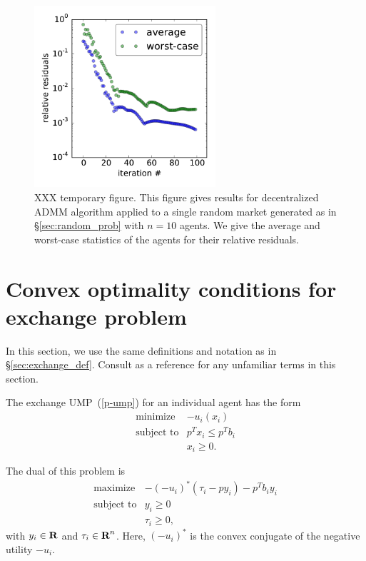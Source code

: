 \documentclass[12pt]{article}
\begin{document}
\begin{figure}
\begin{center}
\includegraphics[width=0.6\textwidth]{figures/admm}
\end{center}
\caption{XXX temporary figure. This figure gives results for decentralized ADMM
algorithm applied to a single random market generated as in
\S\ref{sec:random_prob} with $n=10$ agents. We give the average and worst-case
statistics of the agents for their relative residuals.}
\label{f-admm}
\end{figure}


\appendix


\section{Convex optimality conditions for exchange problem}
\label{sec:exchange_proof}

In this section, we use the same definitions and notation as in
\S\ref{sec:exchange_def}.
Consult \cite{BoV:04} as a reference for any
unfamiliar terms in this section.

The exchange UMP~(\ref{p-ump}) for an individual agent has the form
\[
\begin{array}{ll}
\mbox{minimize} & - u_i(x_i)\\
\mbox{subject to} & p^T x_i \leq p^T b_i\\
& x_i \geq 0.
\end{array}
\]

The dual of this problem is
\[
\begin{array}{ll}
\mbox{maximize} & -(- u_i)^*(\tau_i - p y_i) - p^T b_i y_i\\
\mbox{subject to} & y_i \geq 0\\
& \tau_i \geq 0,
\end{array}
\]
with $y_i \in {\mbox{\bf R}}$ and $\tau_i \in {\mbox{\bf R}}^n$. Here, $(- u_i)^*$
is the convex conjugate of the negative utility $-u_i$.
\end{document}
